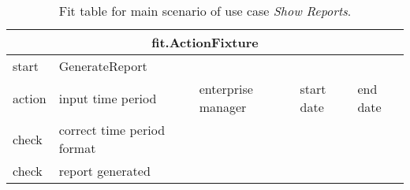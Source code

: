 \begin{table}[H]
\begin{centering}
\begin{tabular}{|l|l|l|l|l|}
\hline  \multicolumn{5}{|c|}{fit.ActionFixture} \\
\hline start & \multicolumn{1}{l}{GenerateReport} &  \multicolumn{3}{l|}{}  \\ 
\hline action & input time period & enterprise manager  & start date  & end date \\ 
\hline check & \multicolumn{1}{l}{correct time period format}  &  \multicolumn{3}{l|}{}\\ 
\hline check & \multicolumn{1}{l}{report generated}  &  \multicolumn{3}{l|}{} \\ 
\hline 
\end{tabular}
\caption{Fit table for main scenario of use case \emph{Show Reports}.}
\end{centering}
\end{table}

